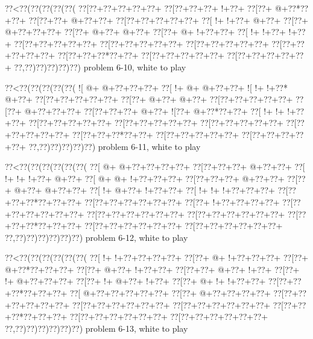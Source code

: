 \vbox{\vbox{\goo
\0??<\0??(\0??(\0??(\0??(\0??(
\0??[\0??+\0??+\0??+\0??+\0??+
\0??[\0??+\0??+\0??+\- !+\0??+
\0??[\0??+\- @+\0??*\0??+\0??+
\0??[\0??+\0??+\- @+\0??+\0??+
\0??[\0??+\0??+\0??+\0??+\0??+
\0??[\- !+\- !+\0??+\- @+\0??+
\0??[\0??+\- @+\0??+\0??+\0??+
\0??[\0??+\- @+\0??+\- @+\0??+
\0??[\0??+\- @+\- !+\0??+\0??+
\0??[\- !+\- !+\0??+\- !+\0??+
\0??[\0??+\0??+\0??+\0??+\0??+
\0??[\0??+\0??+\0??+\0??+\0??+
\0??[\0??+\0??+\0??+\0??+\0??+
\0??[\0??+\0??+\0??+\0??+\0??+
\0??[\0??+\0??+\0??*\0??+\0??+
\0??[\0??+\0??+\0??+\0??+\0??+
\0??[\0??+\0??+\0??+\0??+\0??+
\0??,\0??)\0??)\0??)\0??)\0??)
}
\hfil problem 6-10, white to play\hfil\break
}

\vbox{\vbox{\goo
\0??<\0??(\0??(\0??(\0??(\0??(
\- ![\- @+\- @+\0??+\0??+\0??+
\0??[\- !+\- @+\- @+\0??+\0??+
\- ![\- !+\- !+\0??*\- @+\0??+
\0??[\0??+\0??+\0??+\0??+\0??+
\0??[\0??+\- @+\0??+\- @+\0??+
\0??[\0??+\0??+\0??+\0??+\0??+
\0??[\0??+\- @+\0??+\0??+\0??+
\0??[\0??+\0??+\0??+\- @+\0??+
\- ![\0??+\- @+\0??*\0??+\0??+
\0??[\- !+\- !+\- !+\0??+\0??+
\0??[\0??+\0??+\0??+\0??+\0??+
\0??[\0??+\0??+\0??+\0??+\0??+
\0??[\0??+\0??+\0??+\0??+\0??+
\0??[\0??+\0??+\0??+\0??+\0??+
\0??[\0??+\0??+\0??*\0??+\0??+
\0??[\0??+\0??+\0??+\0??+\0??+
\0??[\0??+\0??+\0??+\0??+\0??+
\0??,\0??)\0??)\0??)\0??)\0??)
}
\hfil problem 6-11, white to play\hfil\break
}

\vbox{\vbox{\goo
\0??<\0??(\0??(\0??(\0??(\0??(\0??(
\0??[\- @+\- @+\0??+\0??+\0??+\0??+
\0??[\0??+\0??+\0??+\- @+\0??+\0??+
\0??[\- !+\- !+\- !+\0??+\- @+\0??+
\0??[\- @+\- @+\- !+\0??+\0??+\0??+
\0??[\0??+\0??+\0??+\- @+\0??+\0??+
\0??[\0??+\- @+\0??+\- @+\0??+\0??+
\0??[\- !+\- @+\0??+\- !+\0??+\0??+
\0??[\- !+\- !+\- !+\0??+\0??+\0??+
\0??[\0??+\0??+\0??*\0??+\0??+\0??+
\0??[\0??+\0??+\0??+\0??+\0??+\0??+
\0??[\0??+\- !+\0??+\0??+\0??+\0??+
\0??[\0??+\0??+\0??+\0??+\0??+\0??+
\0??[\0??+\0??+\0??+\0??+\0??+\0??+
\0??[\0??+\0??+\0??+\0??+\0??+\0??+
\0??[\0??+\0??+\0??*\0??+\0??+\0??+
\0??[\0??+\0??+\0??+\0??+\0??+\0??+
\0??[\0??+\0??+\0??+\0??+\0??+\0??+
\0??,\0??)\0??)\0??)\0??)\0??)\0??)
}
\hfil problem 6-12, white to play\hfil\break
}

\vbox{\vbox{\goo
\0??<\0??(\0??(\0??(\0??(\0??(\0??(
\0??[\- !+\- !+\0??+\0??+\0??+\0??+
\0??[\0??+\- @+\- !+\0??+\0??+\0??+
\0??[\0??+\- @+\0??*\0??+\0??+\0??+
\0??[\0??+\- @+\0??+\- !+\0??+\0??+
\0??[\0??+\0??+\- @+\0??+\- !+\0??+
\0??[\0??+\- !+\- @+\0??+\0??+\0??+
\0??[\0??+\- !+\- @+\0??+\- !+\0??+
\0??[\0??+\- @+\- !+\- !+\0??+\0??+
\0??[\0??+\0??+\0??*\0??+\0??+\0??+
\0??[\- @+\0??+\0??+\0??+\0??+\0??+
\0??[\0??+\- @+\0??+\0??+\0??+\0??+
\0??[\0??+\0??+\0??+\0??+\0??+\0??+
\0??[\0??+\0??+\0??+\0??+\0??+\0??+
\0??[\0??+\0??+\0??+\0??+\0??+\0??+
\0??[\0??+\0??+\0??*\0??+\0??+\0??+
\0??[\0??+\0??+\0??+\0??+\0??+\0??+
\0??[\0??+\0??+\0??+\0??+\0??+\0??+
\0??,\0??)\0??)\0??)\0??)\0??)\0??)
}
\hfil problem 6-13, white to play\hfil\break
}

